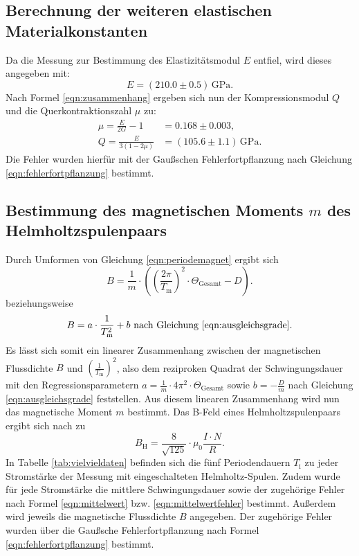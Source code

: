 \subsection{Berechnung der weiteren elastischen Materialkonstanten}
Da die Messung zur Bestimmung des Elastizitätsmodul $E$ entfiel, wird dieses angegeben mit:
\begin{equation*}
	E= (210.0 \pm 0.5 )\,\si{\giga\pascal} \text{.}
\end{equation*}
Nach Formel \eqref{eqn:zusammenhang} ergeben sich nun der Kompressionsmodul $Q$ und die Querkontraktionszahl $\mu$ zu:
\begin{align*}
	\mu  = \frac{E}{2G}-1       & = 0.168\pm 0.003 \mathrm{,}                     \\
	Q    = \frac{E}{3(1-2 \mu)} & = (105.6\pm 1.1) \,\si{\giga\pascal} \mathrm{.}
\end{align*}
Die Fehler wurden hierfür mit der Gaußschen Fehlerfortpflanzung nach Gleichung \eqref{eqn:fehlerfortpflanzung} bestimmt.
\subsection{Bestimmung des magnetischen Moments $m$ des Helmholtzspulenpaars}
Durch Umformen von Gleichung \eqref{eqn:periodemagnet} ergibt sich
\begin{equation}
	\label{eqn:linearB}
	B=\frac{1}{m}\cdot \left(\left(\frac{2\pi}{T_\mathrm{m}}\right)^2 \cdot \Theta_{\mathrm{Gesamt}}-D\right) \text{.}
\end{equation}
beziehungsweise
\begin{equation*}
	B=a\cdot\frac{1}{T_{\mathrm{m}}^2}+b \text{  nach Gleichung \eqref{eqn:ausgleichsgrade}.}
\end{equation*}
Es lässt sich somit ein linearer Zusammenhang zwischen der magnetischen Flussdichte $B$ und $\left(\frac{1}{T_{\mathrm{m}}}\right)^2$, also dem reziproken Quadrat der Schwingungsdauer mit den Regressionsparametern $a=\frac{1}{m}\cdot 4\pi^2 \cdot \Theta_{\mathrm{Gesamt}}$ sowie $b=-\frac{D}{m}$ nach Gleichung \eqref{eqn:ausgleichsgrade} feststellen.
Aus diesem linearen Zusammenhang wird nun das magnetische Moment $m$ bestimmt.
Das B-Feld eines Helmholtzspulenpaars ergibt sich nach \cite{LordHelmchen} zu
\begin{equation}
	\label{eqn:MisterMagneto}
	B_{\mathrm{H}}= \frac{8}{\sqrt{125}}\cdot \mu_{\mathrm{0}} \frac{I\cdot N}{R} \text{.}
\end{equation}
In Tabelle \ref{tab:vielvieldaten} befinden sich die fünf Periodendauern $T_{\mathrm{i}}$ zu jeder Stromstärke der Messung mit eingeschalteten Helmholtz-Spulen.
Zudem wurde für jede Stromstärke die mittlere Schwingungsdauer sowie der zugehörige Fehler nach Formel \eqref{eqn:mittelwert} bzw. \eqref{eqn:mittelwertfehler} bestimmt.
Außerdem wird jeweils die magnetische Flussdichte $B$ angegeben. Der zugehörige Fehler wurden über die Gaußsche Fehlerfortpflanzung nach Formel \eqref{eqn:fehlerfortpflanzung} bestimmt.

